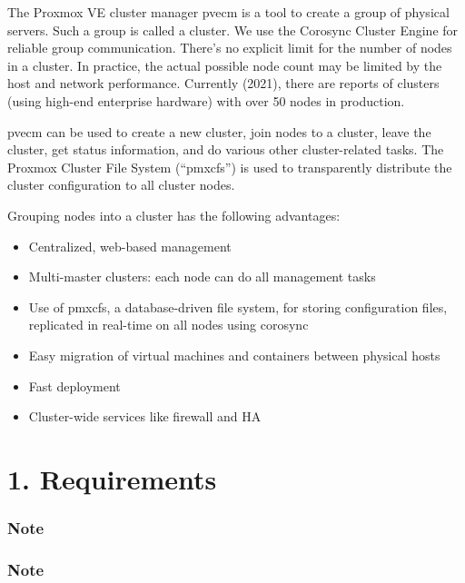 The Proxmox VE cluster manager pvecm is a tool to create a group of physical servers. Such a group is called a cluster. We use the Corosync Cluster Engine for reliable group communication. There’s no explicit limit for the number of nodes in a cluster. In practice, the actual possible node count may be limited by the host and network performance. Currently (2021), there are reports of clusters (using high-end enterprise hardware) with over 50 nodes in production.

pvecm can be used to create a new cluster, join nodes to a cluster, leave the cluster, get status information, and do various other cluster-related tasks. The Proxmox Cluster File System (“pmxcfs”) is used to transparently distribute the cluster configuration to all cluster nodes.

Grouping nodes into a cluster has the following advantages:

\begin{itemize}[leftmargin=2cm]

	\item Centralized, web-based management

	\item Multi-master clusters: each node can do all management tasks

	\item Use of pmxcfs, a database-driven file system, for storing configuration files, replicated in real-time on all nodes using corosync

	\item Easy migration of virtual machines and containers between physical hosts

	\item Fast deployment

	\item Cluster-wide services like firewall and HA

\end{itemize}


\section{1. Requirements}

\subsubsection{Note}

\subsubsection{Note}

